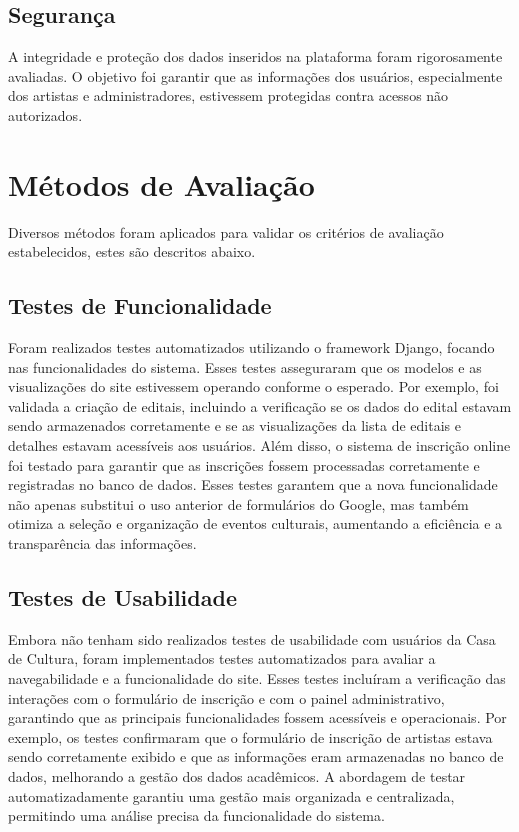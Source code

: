\subsection{Segurança} 
A integridade e proteção dos dados inseridos na plataforma foram rigorosamente avaliadas. O objetivo foi garantir que as informações dos usuários, especialmente dos artistas e administradores, estivessem protegidas contra acessos não autorizados.

\section{Métodos de Avaliação}

Diversos métodos foram aplicados para validar os critérios de avaliação estabelecidos, estes são descritos abaixo.

\subsection{Testes de Funcionalidade} 

Foram realizados testes automatizados utilizando o framework Django, focando nas funcionalidades do sistema. Esses testes asseguraram que os modelos e as visualizações do site estivessem operando conforme o esperado. Por exemplo, foi validada a criação de editais, incluindo a verificação se os dados do edital estavam sendo armazenados corretamente e se as visualizações da lista de editais e detalhes estavam acessíveis aos usuários. Além disso, o sistema de inscrição online foi testado para garantir que as inscrições fossem processadas corretamente e registradas no banco de dados. Esses testes garantem que a nova funcionalidade não apenas substitui o uso anterior de formulários do Google, mas também otimiza a seleção e organização de eventos culturais, aumentando a eficiência e a transparência das informações.

\subsection{Testes de Usabilidade}

Embora não tenham sido realizados testes de usabilidade com usuários da Casa de Cultura, foram implementados testes automatizados para avaliar a navegabilidade e a funcionalidade do site. Esses testes incluíram a verificação das interações com o formulário de inscrição e com o painel administrativo, garantindo que as principais funcionalidades fossem acessíveis e operacionais. Por exemplo, os testes confirmaram que o formulário de inscrição de artistas estava sendo corretamente exibido e que as informações eram armazenadas no banco de dados, melhorando a gestão dos dados acadêmicos. A abordagem de testar automatizadamente garantiu uma gestão mais organizada e centralizada, permitindo uma análise precisa da funcionalidade do sistema.

